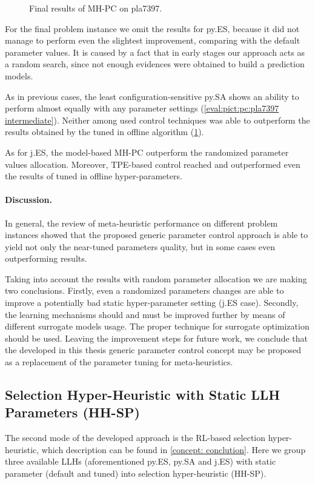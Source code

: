\begin{figure}[b]
	\centering
	\vspace{-20pt}
	
	\caption{Final results of MH-PC on pla7397.}
	\vspace{-5pt}
	\label{eval:pict:pc:pla7397 final}
\end{figure}

For the final problem instance we omit the results for py.ES, because it did not manage to perform even the slightest improvement, comparing with the default parameter values. It is caused by a fact that in early stages our approach acts as a random search, since not enough evidences were obtained to build a prediction models.

As in previous cases, the least configuration-sensitive py.SA shows an ability to perform almost equally with any parameter settings (\cref{eval:pict:pc:pla7397 intermediate}). Neither among used control techniques was able to outperform the results obtained by the tuned in offline algorithm (\cref{eval:pict:pc:pla7397 final}). 

As for j.ES, the model-based MH-PC outperform the randomized parameter values allocation. Moreover, TPE-based control reached and outperformed even the results of tuned in offline hyper-parameters.

\paragraph{Discussion.} In general, the review of meta-heuristic performance on different problem instances showed that the proposed generic parameter control approach is able to yield not only the near-tuned parameters quality, but in some cases even outperforming results.

Taking into account the results with random parameter allocation we are making two conclusions. Firstly, even a randomized parameters changes are able to improve a potentially bad static hyper-parameter setting (j.ES case). Secondly, the learning mechanisms should and must be improved further by means of different surrogate models usage. The proper technique for surrogate optimization should be used. Leaving the improvement steps for future work, we conclude that the developed in this thesis generic parameter control concept may be proposed as a replacement of the parameter tuning for meta-heuristics.


\subsection{Selection Hyper-Heuristic with Static LLH Parameters (HH-SP)}\label{eval:1:hh-sp}
The second mode of the developed approach is the RL-based selection hyper-heuristic, which description can be found in \cref{concept: conclution}. Here we group three available LLHs (aforementioned py.ES, py.SA and j.ES) with static parameter (default and tuned) into selection hyper-heuristic (HH-SP).

